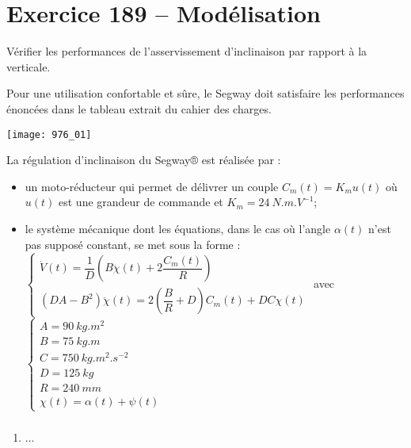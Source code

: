 \section*{Exercice 189 -- Modélisation}
\setcounter{exo}{0}


\begin{obj}
Vérifier les performances de l’asservissement d’inclinaison par rapport à la verticale.
\end{obj}

Pour une utilisation confortable et sûre, le Segway doit satisfaire les performances
énoncées dans le tableau extrait du cahier des charges.
\begin{center}
\texttt{[image: 976\_01]}%
\end{center}
La régulation d’inclinaison du Segway® est réalisée par :
\begin{itemize}
\item un moto-réducteur qui permet de délivrer un couple $C_m(t)=K_m u(t)$ où $u(t)$ est une grandeur de commande et $K_m=\SI{24}{N.m.V^{-1}}$;
\item le système mécanique dont les équations, dans le cas où l’angle $\alpha(t)$ n’est pas supposé constant, se met
sous la forme :
$\left\{
\begin{array}{l}
\dot{V}(t)=\dfrac{1}{D}\left( B\ddot{\chi}(t)+2\dfrac{C_m(t)}{R}\right) \\
\left(DA-B^2\right)\ddot{\chi}(t)=2\left(\dfrac{B}{R}+D\right)C_m(t)+DC\chi(t)
\end{array}
\right.
$ 
avec
$\left\{
\begin{array}{l}
A=\SI{90}{kg.m^2} \\
B=\SI{75}{kg.m} \\
C=\SI{750}{kg.m^2.s^{-2}} \\
D=\SI{125}{kg} \\
R=\SI{240}{mm} \\
\chi(t)=\alpha(t)+\psi(t) 
\end{array}
\right.
$ 
\end{itemize}

\subparagraph{}
\textit{}
\ifprof
\begin{corrige}
\end{corrige}
\else
\fi



\begin{enumerate}
\item ...
\end{enumerate}